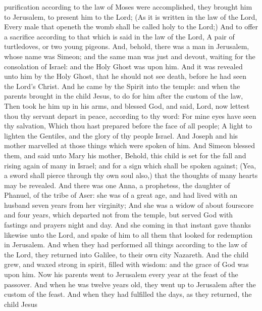 purification according to the law of Moses were accomplished, they
brought him to Jerusalem, to present him to the Lord;  (As
it is written in the law of the Lord, Every male that openeth the womb
shall be called holy to the Lord;)  And to offer a
sacrifice according to that which is said in the law of the Lord, A pair
of turtledoves, or two young pigeons.  And, behold, there
was a man in Jerusalem, whose name was Simeon; and the same man was just
and devout, waiting for the consolation of Israel: and the Holy Ghost
was upon him.  And it was revealed unto him by the Holy
Ghost, that he should not see death, before he had seen the Lord's
Christ.  And he came by the Spirit into the temple: and
when the parents brought in the child Jesus, to do for him after the
custom of the law,  Then took he him up in his arms, and
blessed God, and said,  Lord, now lettest thou thy servant
depart in peace, according to thy word:  For mine eyes have
seen thy salvation,  Which thou hast prepared before the
face of all people;  A light to lighten the Gentiles, and
the glory of thy people Israel.  And Joseph and his mother
marvelled at those things which were spoken of him.  And
Simeon blessed them, and said unto Mary his mother, Behold, this child
is set for the fall and rising again of many in Israel; and for a sign
which shall be spoken against;  (Yea, a sword shall pierce
through thy own soul also,) that the thoughts of many hearts may be
revealed.  And there was one Anna, a prophetess, the
daughter of Phanuel, of the tribe of Aser: she was of a great age, and
had lived with an husband seven years from her virginity; 
And she was a widow of about fourscore and four years, which departed
not from the temple, but served God with fastings and prayers night and
day.  And she coming in that instant gave thanks likewise
unto the Lord, and spake of him to all them that looked for redemption
in Jerusalem.  And when they had performed all things
according to the law of the Lord, they returned into Galilee, to their
own city Nazareth.  And the child grew, and waxed strong in
spirit, filled with wisdom: and the grace of God was upon him.
 Now his parents went to Jerusalem every year at the feast
of the passover.  And when he was twelve years old, they
went up to Jerusalem after the custom of the feast.  And
when they had fulfilled the days, as they returned, the child Jesus
